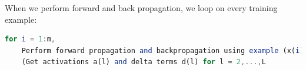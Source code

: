 \documentclass{article}
\begin{document}
When we perform forward and back propagation, we loop on every training example:

\begin{lstlisting}[language=Octave]
for i = 1:m,
	Perform forward propagation and backpropagation using example (x(i),y(i))
	(Get activations a(l) and delta terms d(l) for l = 2,...,L
\end{lstlisting}
\end{document}
